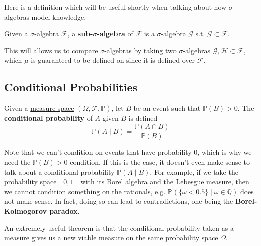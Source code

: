   Here is a definition which will be useful shortly when talking about how $\sigma$-algebras model knowledge. 

  \begin{definition}
    \label{def:sub-sigma-algebras}
    Given a $\sigma$-algebra $\mathcal{F}$, a \textbf{sub-$\sigma$-algebra} of $\mathcal{F}$ is a $\sigma$-algebra $\mathcal{G}$ s.t. $\mathcal{G} \subset \mathcal{F}$. 
  \end{definition}

  This will allows us to compare $\sigma$-algebras by taking two $\sigma$-algebras $\mathcal{G}, \mathcal{H} \subset \mathcal{F}$, which $\mu$ is guaranteed to be defined on since it is defined over $\mathcal{F}$. 

\subsection{Conditional Probabilities}

  \begin{definition}
    \label{def:conditional-probability-w-r-t-events}
    Given a \hyperref[mt-def:measure-space]{measure space} $(\Omega, \mathcal{F}, \mathbb{P})$, let $B$ be an event such that $\mathbb{P}(B) > 0$. The \textbf{conditional probability} of $A$ given $B$ is defined 
    \begin{equation}
      \mathbb{P}(A \mid B) = \frac{\mathbb{P}(A \cap B)}{\mathbb{P}(B)}
    \end{equation}
  \end{definition}

  Note that we can't condition on events that have probability $0$, which is why we need the $\mathbb{P}(B) > 0$ condition. If this is the case, it doesn't even make sense to talk about a conditional probability $\mathbb{P}(A \mid B)$. For example, if we take the \hyperref[def:probability-space]{probability space} $[0, 1]$ with its Borel algebra and the \hyperref[mt-def:lebesgue-measure]{Lebesgue measure}, then we cannot condition something on the rationals, e.g. $\mathbb{P}(\{\omega < 0.5\} \mid \omega \in \mathbb{Q})$ does not make sense. In fact, doing so can lead to contradictions, one being the \textbf{Borel-Kolmogorov paradox}. 

  An extremely useful theorem is that the conditional probability taken as a measure gives us a new viable measure on the same probability space $\Omega$. 

